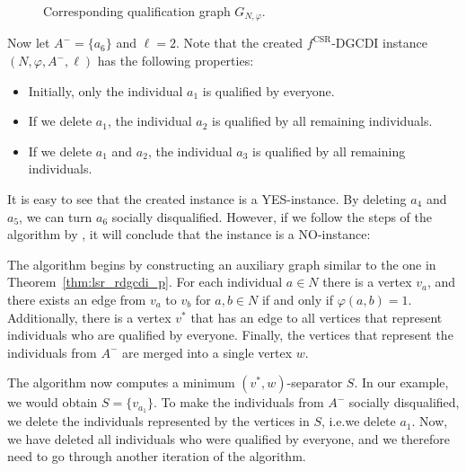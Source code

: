 \documentclass[
    12pt,               %
    a4paper,            %
    bibtotoc,           %
    pointlessnumbers,   %
    ngerman,            %
    titlepage,          %
    leqno,              %
    ]{scrarticle}       %
\newcommand\thmref{Theorem~\ref}
\begin{document}
\begin{Example}
\begin{figure}[!h]
\begin{minipage}[b]{.6\textwidth}
{
}
\caption*{Corresponding qualification graph $G_{N, \varphi}$.}

\end{minipage}
\end{figure}
\capstarttrue %

Now let $A^- = \{a_6\}$ and $\ell = 2$. Note that the created $f^{\text{CSR}}$-DGCDI instance $(N, \varphi, A^-, \ell)$ has the following properties:
\begin{itemize}[nolistsep]
\item
Initially, only the individual $a_1$ is qualified by everyone.
\item
If we delete $a_1$, the individual $a_2$ is qualified by all remaining individuals.
\item
If we delete $a_1$ and $a_2$, the individual $a_3$ is qualified by all remaining individuals.
\end{itemize}

It is easy to see that the created instance is a YES-instance. By deleting $a_4$ and $a_5$, we can turn $a_6$ socially disqualified. However, if we follow the steps of the algorithm by \textcite[Theorem 7]{ERY20}, it will conclude that the instance is a NO-instance:

The algorithm begins by constructing an auxiliary graph similar to the one in \thmref{thm:lsr_rdgcdi_p}. For each individual $a \in N$ there is a vertex $v_a$, and there exists an edge from $v_a$ to $v_b$ for $a, b \in N$ if and only if $\varphi(a, b) = 1$. Additionally, there is a vertex $v^\ast$ that has an edge to all vertices that represent individuals who are qualified by everyone. Finally, the vertices that represent the individuals from $A^-$ are merged into a single vertex $w$.

The algorithm now computes a minimum $(v^\ast, w)$-separator $S$. In our example, we would obtain $S = \{v_{a_1}\}$. To make the individuals from $A^-$ socially disqualified, we delete the individuals represented by the vertices in $S$, i.e.\@ we delete $a_1$. Now, we have deleted all individuals who were qualified by everyone, and we therefore need to go through another iteration of the algorithm.


\end{Example}
\end{document}
